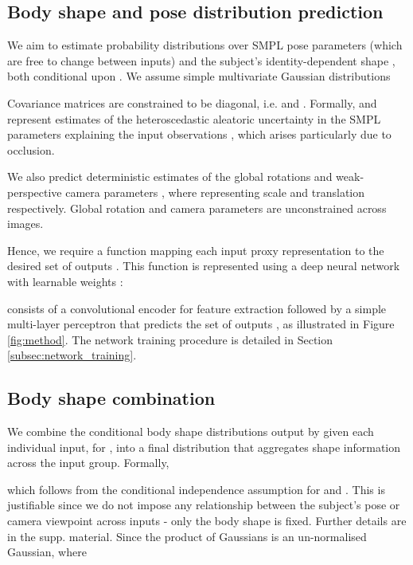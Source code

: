 \documentclass[final]{cvpr}
\begin{document}
\subsection{Body shape and pose distribution prediction}

We aim to estimate probability distributions \cite{nix1994icnn} over SMPL pose parameters  (which are free to change between inputs) and the subject's identity-dependent shape , both conditional upon . We assume simple multivariate Gaussian distributions

Covariance matrices are constrained to be diagonal, i.e.  and . Formally,  and  represent estimates of the heteroscedastic aleatoric uncertainty \cite{derkiureghian2009aleatoric_epistemic, kendall2017whatuncertainties} in the SMPL parameters explaining the input observations , which arises particularly due to occlusion.

We also predict deterministic estimates of the global rotations  and weak-perspective camera parameters , where  representing scale and  translation respectively. Global rotation and camera parameters are unconstrained across images.

Hence, we require a function mapping each input proxy representation  to the desired set of outputs . This function is represented using a deep neural network  with learnable weights :

 consists of a convolutional encoder for feature extraction followed by a simple multi-layer perceptron that predicts the set of outputs , as illustrated in Figure \ref{fig:method}. The network training procedure is detailed in Section \ref{subsec:network_training}.

\subsection{Body shape combination}
\label{subsec:body_shape_combination}

We combine the conditional body shape distributions output by  given each individual input,  for , into a final distribution  that aggregates shape information across the input group. Formally,

which follows from the conditional independence assumption  for  and . This is justifiable since we do not impose any relationship between the subject's pose or camera viewpoint across inputs - only the body shape is fixed. Further details are in the supp. material. Since the product of Gaussians is an un-normalised Gaussian,  where
\end{document}
